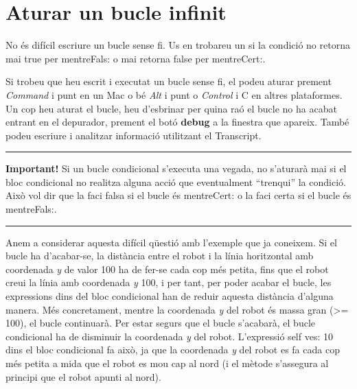 \section{Aturar un bucle infinit}
No és difícil escriure un bucle sense fi. Us en trobareu un si la condició no retorna mai \textsf{true} per \textsf{mentreFals:} o mai retorna \textsf{false} per \textsf{mentreCert:}.

Si trobeu que heu escrit i executat un bucle sense fi, el podeu aturar prement \emph{Command} i punt en un Mac o bé \emph{Alt} i punt o \emph{Control} i C en altres plataformes. Un cop heu aturat el bucle, heu d'esbrinar per quina raó el bucle no ha acabat entrant en el depurador, prement el botó \textbf{debug} a la finestra que apareix. També podeu escriure i analitzar informació utilitzant el \textsf{Transcript}.
\vspace*{2mm}
\noindent
\rule{\textwidth}{2pt}
\noindent
\textbf{Important!} Si un bucle condicional s'executa una vegada, no s'aturarà mai si el bloc condicional no realitza alguna acció que eventualment ``trenqui'' la condició. Això vol dir que la faci falsa si el bucle és \textsf{mentreCert:} o la faci certa si el bucle és \textsf{mentreFals:}.\\
\noindent
\rule{\textwidth}{2pt}
\vspace*{1mm}

Anem a considerar aquesta difícil qüestió amb l'exemple que ja coneixem. Si el bucle ha d'acabar-se, la distància entre el robot i la línia horitzontal amb coordenada \emph{y} de valor 100 ha de fer-se cada cop més petita, fins que el robot creui la línia amb coordenada \emph{y} 100, i per tant, per poder acabar el bucle, les expressions dins del bloc condicional han de reduir aquesta distància d'alguna manera. Més concretament, mentre la coordenada \emph{y} del robot és massa gran (\textsf{\textgreater = 100}), el bucle continuarà. Per estar segurs que el bucle s'acabarà, el bucle condicional ha de disminuir la coordenada \emph{y} del robot. L'expressió \textsf{self ves: 10} dins el bloc condicional fa això, ja que la coordenada \emph{y} del robot es fa cada cop més petita a mida que el robot es mou cap al nord (i el mètode s'assegura al principi que el robot apunti al nord).

